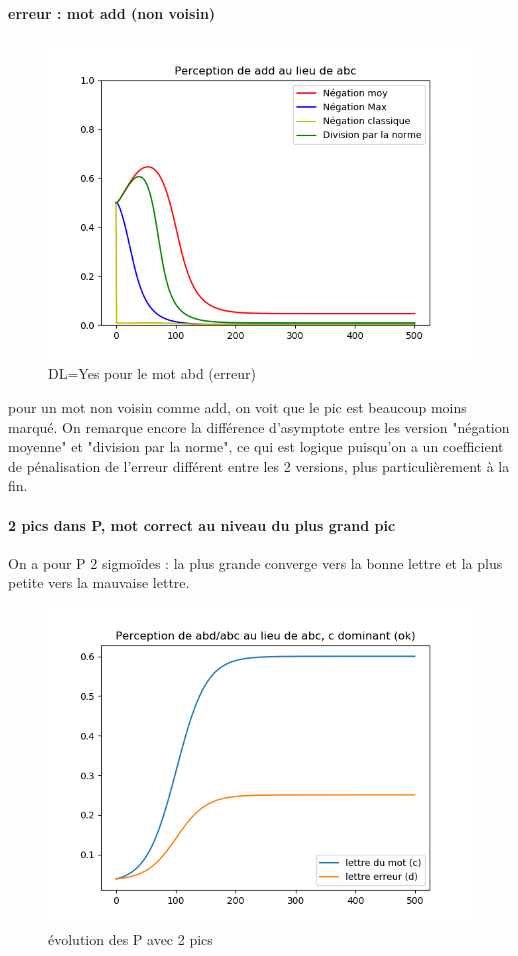 \documentclass{article}
\begin{document}
\paragraph{erreur : mot add (non voisin)}

\begin{figure}[H]
\centering
	\includegraphics[scale=0.5]{add.png}
	\caption{DL=Yes pour le mot abd (erreur)}
\end{figure} 


pour un mot non voisin comme add, on voit que le pic est beaucoup moins marqué.
On remarque encore la différence d'asymptote entre les version "négation moyenne" et "division par la norme", ce qui est logique puisqu'on a un coefficient de pénalisation de l'erreur différent entre les 2 versions, plus particulièrement à la fin.



    
\paragraph{2 pics dans P, mot correct au niveau du plus grand pic}
On a pour P 2 sigmoïdes : 
la plus grande converge vers la bonne lettre et la plus petite vers la mauvaise lettre.

\begin{figure}[H]
\centering
	\includegraphics[scale=0.6]{P_abC_abd.png}
	\caption{évolution des P avec 2 pics}
\end{figure} 
\end{document}
